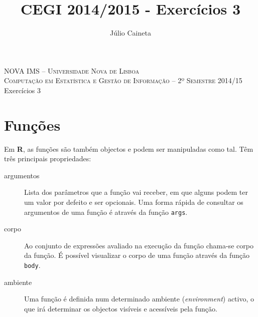 \documentclass{exam}
\author{Júlio Caineta}
\title{CEGI 2014/2015 - Exercícios 3}
\begin{document}
 
\begin{center}
\textsc {\small NOVA IMS -- Universidade Nova de Lisboa} \\
\textsc {Computação em Estatística e Gestão de Informação -- 2º Semestre 2014/15}
\vspace{5mm} \\
{\large Exercícios 3}
\end{center}
 
\vspace{5mm}

\section*{Funções}

Em \textbf{R}, as funções são também objectos e podem ser manipuladas como tal. Têm três principais propriedades:

\begin{description}
	\item[argumentos] Lista dos parâmetros que a função vai receber, em que alguns podem ter um valor por defeito e ser opcionais. Uma forma rápida de consultar os argumentos de uma função é através da função \texttt{args}.
	\item[corpo]  Ao conjunto de expressões avaliado na execução da função chama-se corpo da função. É possível visualizar o corpo de uma função através da função \texttt{body}.
	\item[ambiente] Uma função é definida num determinado ambiente (\textit{environment}) activo, o que irá determinar os objectos visíveis e acessíveis pela função.
\end{description}
\end{document}
